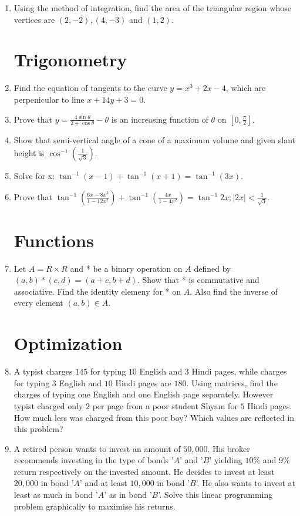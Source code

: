 \documentclass[10pt,-letter paper]{article}
\providecommand{\brak}[1]{\ensuremath{\left(#1\right)}}
\providecommand{\abs}[1]{\left\vert#1\right\vert}
\begin{document}
\begin{enumerate}
\item Using the method of integration, find the area of the triangular region whose vertices are $(2,-2), (4,-3)$ and $(1,2)$.

\section{Trigonometry}

\item Find the equation of tangents to the curve $y=x^3+2x-4$, which are perpenicular to line $x+14y+3=0$.

\item Prove that $y = \frac{4\sin\theta}{2+\cos\theta} - \theta$ is an increasing function of $\theta$ on $\left [0, \frac{\pi}{2}\right ]$.

\item Show that semi-vertical angle of a cone of a maximum volume and given slant height is $\cos^{-1}\brak{\frac{1}{\sqrt{3}}}$.

\item Solve for x: $\tan^{-1}(x-1) + \tan^{-1}(x+1) = \tan^{-1}(3x)$.

\item Prove that $\tan^{-1}\brak{\frac{6x-8x^3}{1-12x^2}} + \tan^{-1}\brak{\frac{4x}{1-4x^2}} = \tan^{-1}2x; \abs{2x}<\frac{1}{\sqrt{3}}$.

\section{Functions}

\item Let $A=R\times R$ and * be a binary operation on $A$ defined by $(a,b)*(c,d) = (a+c,b+d)$.
Show that * is commutative and associative. Find the identity elemeny for * on $A$. Also find the inverse of every element $(a, b) \in A$.

\section{Optimization}

\item A typist charges \rupee $145$ for typing $10$ English and $3$ Hindi pages, while charges for typing $3$ English and $10$ Hindi pages are \rupee $180$. Using matrices, find the charges of typing one English and one English page separately. However typist charged only \rupee $2$ per page from a poor student Shyam for $5$ Hindi pages. How much less was charged from this poor boy? Which values are reflected in this problem?

\item A retired person wants to invest an amount of \rupee $50,000$. His broker recommends investing in the type of bonds '$A$' and '$B$' yielding $10\%$ and $9\%$ return respectively on the invested amount. He decides to invest at least \rupee $20,000$ in bond '$A$' and at least \rupee $10,000$ in bond '$B$'. He also wants to invest at least as much in bond '$A$' as in bond '$B$'. Solve this linear programming problem graphically to maximise his returns.

\end{enumerate}
\end{document}
